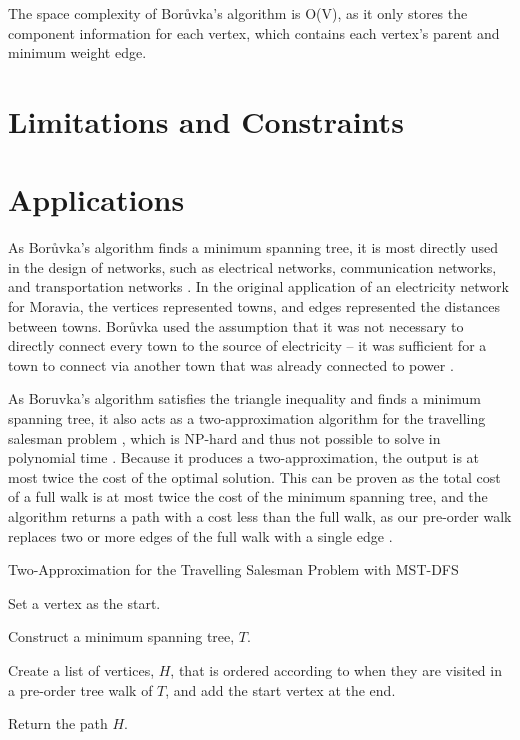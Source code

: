 \documentclass[a4paper, 11pt]{article}
\begin{document}
The space complexity of Borůvka's algorithm is O(V), as it only stores the component information for each vertex, which contains each vertex's parent and minimum weight edge.

\section{Limitations and Constraints}

\section{Applications}
As Borůvka's algorithm finds a minimum spanning tree, it is most directly used in the design of networks, such as electrical networks, communication networks, and transportation networks \cite{graham1985history}. In the original application of an electricity network for Moravia, the vertices represented towns, and edges represented the distances between towns. Borůvka used the assumption that it was not necessary to directly connect every town to the source of electricity -- it was sufficient for a town to connect via another town that was already connected to power \cite{nevsetvril2001otakar}.

As Boruvka's algorithm satisfies the triangle inequality and finds a minimum spanning tree, it also acts as a two-approximation algorithm for the travelling salesman problem \cite{andreae1995performance}, which is NP-hard and thus not possible to solve in polynomial time \cite{junger1995traveling}. Because it produces a two-approximation, the output is at most twice the cost of the optimal solution. This can be proven as the total cost of a full walk is at most twice the cost of the minimum spanning tree, and the algorithm returns a path with a cost less than the full walk, as our pre-order walk replaces two or more edges of the full walk with a single edge \cite{andreae1995performance}.

\begin{algorithm}
    \caption{Two-Approximation for the Travelling Salesman Problem with MST-DFS \cite{andreae1995performance}}
    \nl Set a vertex as the start.
    
    \nl Construct a minimum spanning tree, $T$.
    
    \nl Create a list of vertices, $H$, that is ordered according to when they are visited in a pre-order tree walk of $T$, and add the start vertex at the end.
    
    \nl Return the path $H$.
\end{algorithm}
\end{document}

